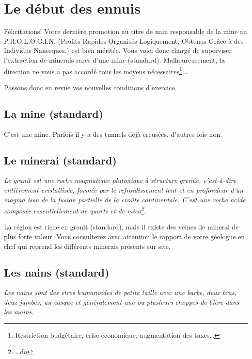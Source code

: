 
\newpage

\section{Le début des ennuis}

  Félicitations! Votre dernière promotion au titre de nain responsable de la
  mine au P.R.O.L.O.G.I.N. (Profits Rapides Organisés Logiquement, Obtenus
  Grâce à des Individus Nanesques.) est bien méritée. Vous voici donc chargé de
  superviser l'extraction de minerais rares d'une mine (standard).
  Malheureusement, la direction ne vous a pas accordé tous les moyens
  nécessaires\footnote{ Restriction budgétaire, crise économique, augmentation
  des taxes\ldots{}} \ldots{}

  Passons donc en revue vos nouvelles conditions d'exercice.

\subsection{La mine (standard)}

C'est une mine. Parfois il y a des tunnels déjà creusées,  d'autres fois non.

\subsection{Le minerai (standard)}

  \textit{Le granit est une roche magmatique plutonique à structure grenue,
  c'est-à-dire entièrement cristallisée, formée par le refroidissement lent et
  en profondeur d'un magma issu de la fusion partielle de la croûte
  continentale.  C'est une roche acide composée essentiellement de quartz et de
  mica\footnote{\ldots{}do}.}

  La région est riche en granit (standard), mais il existe des veines de
  minerai de plus forte valeur. Vous consulterez avec attention le rapport de
  votre géologue en chef qui reprend les différents minerais présents sur site.

\subsection{Les nains (standard)}

  \textit{Les nains sont des êtres humanoïdes de petite taille avec une barbe,
  deux bras, deux jambes, un casque et généralement une ou plusieurs choppes de
  bière dans les mains.}


